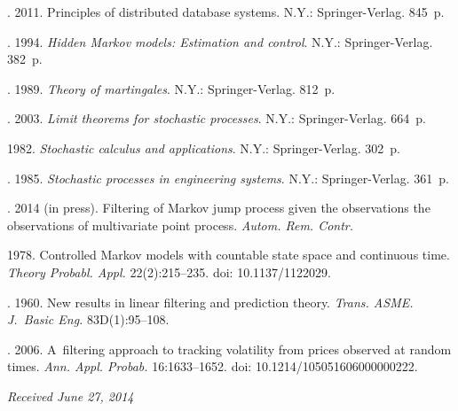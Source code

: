 \begin{multicols}{2}
{{\begin{thebibliography}{99}
. 2011.
Principles of distributed database systems. N.Y.: Springer-Verlag. 845~p.

. 1994.
\textit{Hidden Markov models: Estimation and control}.
N.Y.: Springer-Verlag. 382~p.

. 1989.
\textit{Theory of martingales}. N.Y.: Springer-Verlag. 812~p.

. 2003.
\textit{Limit theorems for stochastic processes}. N.Y.: Springer-Verlag. 664~p.

 1982.
\textit{Stochastic calculus and applications}. N.Y.: Springer-Verlag. 302~p.

. 1985. \textit{Stochastic processes in engineering
systems}. N.Y.: Springer-Verlag. 361~p.

. 2014 (in press).
Filtering of Markov jump process given the observations the observations of
multivariate point process. \textit{Autom. Rem. Contr.}

1978. Controlled Markov models with countable state space and continuous time.
\textit{Theory Probabl. Appl.} 22(2):215--235. doi: 10.1137/1122029.

. 1960.
New results in linear filtering and prediction theory.
\textit{Trans. ASME. J.~Basic Eng.} 83D(1):95--108.


. 2006.
A~filtering approach to tracking volatility from prices observed at random times.
\textit{Ann. Appl. Probab.} 16:1633--1652.
doi: 10.1214/105051606000000222.


\end{thebibliography}

 }
 }

\end{multicols}

\vspace*{-6pt}

\hfill{\small\textit{Received June 27, 2014}}

